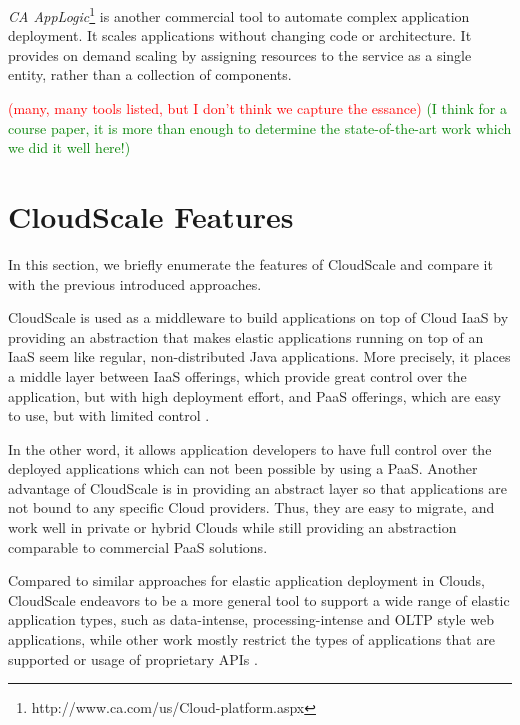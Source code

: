 \documentclass{sig-alternate}
\newcommand\todo[1]{\textcolor{red}{(#1)}}
\newcommand\done[1]{\textcolor{green}{(#1)}}
\begin{document}
\emph{CA AppLogic}\footnote{http://www.ca.com/us/Cloud-platform.aspx} is another commercial tool to automate complex application deployment. It scales applications without changing code or architecture. It provides on demand scaling by assigning resources to the service as a single entity, rather than a collection of components.

\todo{many, many tools listed, but I don't think we capture the essance} \done{I think for a course paper, it is more than enough to determine the state-of-the-art work which we did it well here!}
\section{CloudScale Features} {\label{CloudScale}
In this section, we briefly enumerate the features of CloudScale and compare it with the previous introduced approaches.

CloudScale is used as a middleware to build applications on top of Cloud IaaS by providing an abstraction that makes elastic applications running on top of an IaaS seem like regular, non-distributed Java applications. More precisely, it places a middle layer between IaaS offerings, which provide great control over the application, but with high deployment effort, and PaaS offerings, which are easy to use, but with limited control \cite{leitner2012Cloudscale}. 

In the other word, it allows application developers to have full control over the deployed applications which can not been possible by using a PaaS. Another advantage of CloudScale is in providing an abstract layer so that applications are not bound to any specific Cloud providers. Thus, they are easy to migrate, and work well in private or hybrid Clouds while still providing an abstraction comparable to commercial PaaS solutions. 

Compared to similar approaches for elastic application deployment in Clouds, CloudScale endeavors to be a more general tool to support a wide range of elastic application types, such as data-intense, processing-intense and OLTP style web applications, while other work mostly restrict the types of applications that are supported or usage of proprietary APIs \cite{Leitner2013}.

}
\end{document}
